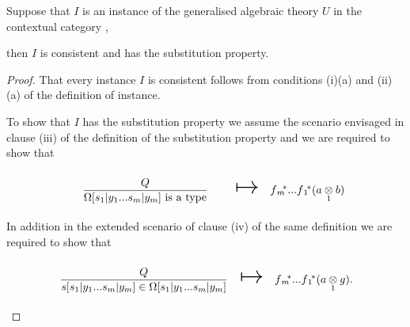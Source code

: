 \begin{lemma}
Suppose that $I$ is an instance of the generalised algebraic theory $U$ in the contextual category \catc,
\begin{newtt}
then $I$ is consistent and has the substitution property.
\end{newtt}
\end{lemma}
\begin{proof}

That every instance $I$ is consistent follows from conditions (i)(a) and (ii)(a) of the definition of instance. 


\newcommand {\forceSOURCEwidth}{\rule{5cm}{0pt}}  %
\newcommand {\forceTARGETwidth}{\rule{2.2cm}{0pt}}
\newcommand{\sonerule} {\gatdisplayrule{Q}         {\ofT{s_1}{\Omega_1}}}
\newcommand{\stworule}  {\gatdisplayrule{Q}       {\ofT{s_2}{\Omega_2[s_1|y_1]}}}
\newcommand{\weakenedOmegarule}{\gatdisplayrule{Q,\, \yOmega{m}} {\isT{\Omega}} }
\newcommand{\weakenedsrule}    {\gatdisplayrule{Q,\, \yOmega{m}} {\ofT{s}{\Omega}} }
\newcommand{\weakenedOmegaruleFirstsubstitution}{\gatdisplayrule{Q,\, \ofT{y_2}{\Omega_2[s_1|y_1]},\,...\,\ofT{y_m}{\Omega_m[s_1|y_1]}}{\isT{\Omega[s_1|y_1]}} }
\newcommand{\weakenedsruleFirstsubstitution}{\gatdisplayrule{Q,\, \ofT{y_2}{\Omega_2[s_1|y_1]},\,...\,\ofT{y_m}{\Omega_m[s_1|y_1]}}{\ofT{s[s_1|y_1]}{\Omega[s_1|y_1]}} }
\newcommand{\weakenedOmegaruleSecondsubstitution}{\gatdisplayrule{Q,\, \ofT{y_3}{\Omega_2[s_1|y_1, s_2|y_2]},\,...\,\ofT{y_m}{\Omega_m[s_1|y_1, s_2|y_2]}}{\isT{\Omega[s_1|y_1, s_2|y_2]}} }
\newcommand{\weakenedsruleSecondsubstitution}{\gatdisplayrule{Q,\, \ofT{y_2}{\Omega_2[s_1|y_1, s_2|y_2]},\,...\,\ofT{y_m}{\Omega_m[s_1|y_1, s_2|y_2]}}{\ofT{s[s_1|y_1, s_2|y_2]}{\Omega[s_1|y_1, s_2|y_2]}} }


To show that $I$ has the substitution property we assume the scenario envisaged in clause (iii) of the definition of the substitution property
and we are required to show that
\begin{equation}
\label{substitutionmappingone}
\begin{array}{c c c}
\forceSOURCEwidth & & \forceTARGETwidth \\ [-0.1cm]
\omegarulesubstituted  & \Imapsto & \fmstar...\fonestar (\crossx{a}{b}{1})  
\end{array}
\end{equation}
In addition in the extended scenario of clause (iv) of the same definition  we are required to show that
\begin{equation}
\label{substitutionmappingtwo}
\begin{array}{c c c}
\forceSOURCEwidth & & \forceTARGETwidth \\ [-0.1cm]
\srulesubstituted & \Imapsto & \fmstar...\fonestar (\crossx{a}{g}{1}).  
\end{array}
\end{equation}


\end{proof}
